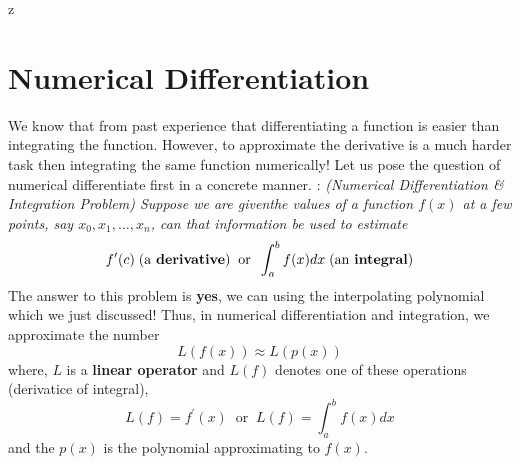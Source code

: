 z\documentclass[a4paper,12pt,twoside]{book}
\newcommand{\nll}[0]{\newline\newline}
\newcommand{\tit}[1]{\textit{#1}}
\newcommand{\defin}[0]{\boxed{\textbf{\textit{Definition}}}}
\begin{document}
\chapter{Numerical Differentiation}
We know that from past experience that differentiating a function is easier than integrating the function. However, to approximate the derivative is a much harder task then integrating the same function numerically!
\nll
Let us pose the question of numerical differentiate first in a concrete manner.
\nll
\defin  : \tit{(Numerical Differentiation \& Integration Problem) Suppose we are giventhe values of a function $f(x)$ at a few points, say $x_0, x_1, \dots, x_n$, can that information be used to estimate
\[ f^\prime(c) \;\text{(a \textbf{derivative})}\;\; \text{or} \;\; \int_a^b f(x)dx  \;\text{(an \textbf{integral})}\]
}
\nll
The answer to this problem is \textbf{yes}, we can using the interpolating polynomial which we just discussed!
\nll
Thus, in numerical differentiation and integration, we approximate the number
\[ L(f(x))\approx L(p(x)) \]
where,
$L$ is a \textbf{linear operator} and $L(f)$ denotes one of these operations (derivatice of integral),
\[L(f) = f^\prime(x) \;\;\text{or} \;\; L(f) = \int_a^b f(x)dx \]
and the $p(x)$ is the polynomial approximating to $f(x)$.
\end{document}
